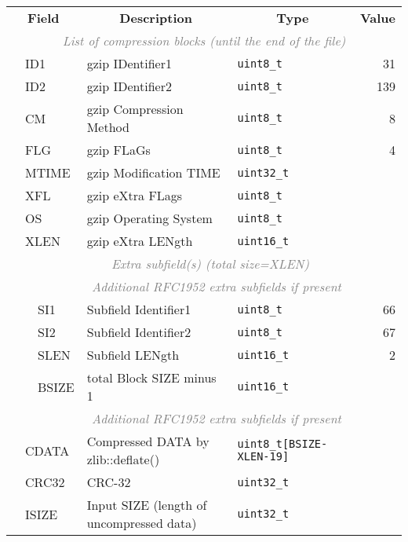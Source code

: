 \documentclass[10pt]{article}
\begin{document}
\begin{table}[h]
\centering
{\small
\begin{tabular}{|l|l|l|l|l|r|}
  \cline{1-6}
  \multicolumn{3}{|c|}{\bf Field} & \multicolumn{1}{c|}{\bf Description} & \multicolumn{1}{c|}{\bf Type} & \multicolumn{1}{c|}{\bf Value} \\\cline{1-6}
  \multicolumn{6}{|c|}{\textcolor{gray}{\it List of compression blocks (until the end of the file)}} \\\cline{2-6}
  & \multicolumn{2}{l|}{\sf ID1} & gzip IDentifier1 & {\tt uint8\_t} & 31 \\\cline{2-6}
  & \multicolumn{2}{l|}{\sf ID2} & gzip IDentifier2 & {\tt uint8\_t} & 139 \\\cline{2-6}
  & \multicolumn{2}{l|}{\sf CM} & gzip Compression Method & {\tt uint8\_t} & 8 \\\cline{2-6}
  & \multicolumn{2}{l|}{\sf FLG} & gzip FLaGs & {\tt uint8\_t} & 4 \\\cline{2-6}
  & \multicolumn{2}{l|}{\sf MTIME} & gzip Modification TIME & {\tt uint32\_t} & \\\cline{2-6}
  & \multicolumn{2}{l|}{\sf XFL} & gzip eXtra FLags & {\tt uint8\_t} & \\\cline{2-6}
  & \multicolumn{2}{l|}{\sf OS} & gzip Operating System & {\tt uint8\_t} & \\\cline{2-6}
  & \multicolumn{2}{l|}{\sf XLEN} & gzip eXtra LENgth & {\tt uint16\_t} & \\\cline{2-6}
  & \multicolumn{5}{c|}{\textcolor{gray}{\it Extra subfield(s) (total size=XLEN)}} \\\cline{3-6}
  & & \multicolumn{4}{c|}{\textcolor{gray}{\it Additional RFC1952 extra subfields if present}} \\\cline{3-6}
  & & {\sf SI1} & Subfield Identifier1 & {\tt uint8\_t} & 66 \\\cline{3-6}
  & & {\sf SI2} & Subfield Identifier2 & {\tt uint8\_t} & 67 \\\cline{3-6}
  & & {\sf SLEN} & Subfield LENgth & {\tt uint16\_t} & 2 \\\cline{3-6}
  & & {\sf BSIZE} & total Block SIZE minus 1 & {\tt uint16\_t} & \\\cline{3-6}
  & & \multicolumn{4}{c|}{\textcolor{gray}{\it Additional RFC1952 extra subfields if present}} \\\cline{2-6}
  & \multicolumn{2}{l|}{\sf CDATA} & Compressed DATA by {\sf zlib::deflate()} & {\tt uint8\_t[{\sf BSIZE-XLEN-19}]} & \\\cline{2-6}
  & \multicolumn{2}{l|}{\sf CRC32} & CRC-32 & {\tt uint32\_t} & \\\cline{2-6}
  & \multicolumn{2}{l|}{\sf ISIZE} & Input SIZE (length of uncompressed data) & {\tt uint32\_t} & \\
  \cline{1-6}
\end{tabular}}
\end{table}
\end{document}
